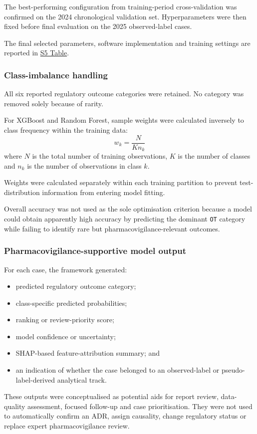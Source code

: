 \documentclass[10pt]{article}
\begin{document}
The best-performing configuration from training-period cross-validation was confirmed on the 2024 chronological validation set. Hyperparameters were then fixed before final evaluation on the 2025 observed-label cases.

The final selected parameters, software implementation and training settings are reported in \hyperref[s5tab]{S5 Table}.

\subsubsection{Class-imbalance handling}
All six reported regulatory outcome categories were retained. No category was removed solely because of rarity.

For XGBoost and Random Forest, sample weights were calculated inversely to class frequency within the training data:
\begin{equation}
w_k = \frac{N}{K n_k}
\end{equation}
where $N$ is the total number of training observations, $K$ is the number of classes and $n_k$ is the number of observations in class $k$.

Weights were calculated separately within each training partition to prevent test-distribution information from entering model fitting.

Overall accuracy was not used as the sole optimisation criterion because a model could obtain apparently high accuracy by predicting the dominant \texttt{OT} category while failing to identify rare but pharmacovigilance-relevant outcomes.

\subsubsection{Pharmacovigilance-supportive model output}
For each case, the framework generated:
\begin{itemize}
\item predicted regulatory outcome category;
\item class-specific predicted probabilities;
\item ranking or review-priority score;
\item model confidence or uncertainty;
\item SHAP-based feature-attribution summary; and
\item an indication of whether the case belonged to an observed-label or pseudo-label-derived analytical track.
\end{itemize}
These outputs were conceptualised as potential aids for report review, data-quality assessment, focused follow-up and case prioritisation. They were not used to automatically confirm an ADR, assign causality, change regulatory status or replace expert pharmacovigilance review.
\end{document}
